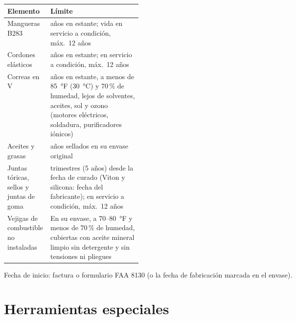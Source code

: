 \begin{center}
\small
\begin{tabularx}{\linewidth}{@{}>{\raggedright\arraybackslash}p{0.32\linewidth}>{\raggedright\arraybackslash}X@{}}
\toprule
Elemento & Límite \\
\midrule
Mangueras B283 & 5 años en estante; vida en servicio a condición, máx.\ 12 años \\
Cordones elásticos & 5 años en estante; en servicio a condición, máx.\ 12 años \\
Correas en V & 4 años en estante, a menos de 85~°F (30~°C) y 70\,\% de humedad, lejos de solventes, aceites, sol y ozono (motores eléctricos, soldadura, purificadores iónicos) \\
Aceites y grasas & 5 años sellados en su envase original \\
Juntas tóricas, sellos y juntas de goma & 20 trimestres (5 años) desde la fecha de curado (Viton y silicona: fecha del fabricante); en servicio a condición, máx.\ 12 años \\
Vejigas de combustible no instaladas & En su envase, a 70--80~°F y menos de 70\,\% de humedad, cubiertas con aceite mineral limpio sin detergente y sin tensiones ni pliegues \\
\bottomrule
\end{tabularx}
\end{center}

Fecha de inicio: factura o formulario FAA 8130 (o la fecha de fabricación marcada en el envase).

\section{Herramientas especiales}

